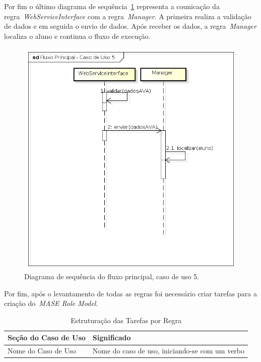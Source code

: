 Por fim o último diagrama de sequência~\ref{fig:dss-uc5-fluxo-principal} representa a counicação da regra~\emph{WebServiceInterface} com a regra~\emph{Manager}. A primeira realiza a validação de dados e em seguida o envio de dados. Após receber os dados, a regra~\emph{Manager} localiza o aluno e continua o fluxo de execução.

\begin{figure}
	\centering
	\includegraphics[scale=0.48]{images/dss-uc5-fluxo-principal.png}
	\caption{Diagrama de sequência do fluxo principal, caso de uso 5.}
	\label{fig:dss-uc5-fluxo-principal}
\end{figure}

Por fim, após o levantamento de todas as regras foi necessário criar tarefas para a criação do~\emph{MASE Role Model}.


\begin{table}
	\caption{Estruturação das Tarefas por Regra}
	\begin{tabular}{|p{5cm} | p{9cm}|}
		\hline
		\textbf{Seção do Caso de Uso}	& \textbf{Significado} \\
		\hline
		Nome do Caso de Uso 	& Nome do caso de uso, iniciando-se com um verbo  \\
		\hline
	\end{tabular}
	\label{tabela:topicos_uc}
\end{table}

